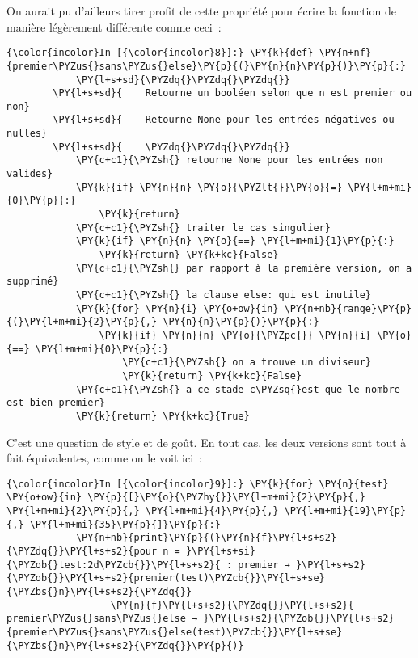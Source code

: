     On aurait pu d'ailleurs tirer profit de cette propriété pour écrire la
fonction de manière légèrement différente comme ceci~:

    \begin{Verbatim}[commandchars=\\\{\},frame=single,framerule=0.3mm,rulecolor=\color{cellframecolor}]
{\color{incolor}In [{\color{incolor}8}]:} \PY{k}{def} \PY{n+nf}{premier\PYZus{}sans\PYZus{}else}\PY{p}{(}\PY{n}{n}\PY{p}{)}\PY{p}{:}
            \PY{l+s+sd}{\PYZdq{}\PYZdq{}\PYZdq{}}
        \PY{l+s+sd}{    Retourne un booléen selon que n est premier ou non}
        \PY{l+s+sd}{    Retourne None pour les entrées négatives ou nulles}
        \PY{l+s+sd}{    \PYZdq{}\PYZdq{}\PYZdq{}}
            \PY{c+c1}{\PYZsh{} retourne None pour les entrées non valides}
            \PY{k}{if} \PY{n}{n} \PY{o}{\PYZlt{}}\PY{o}{=} \PY{l+m+mi}{0}\PY{p}{:}
                \PY{k}{return}
            \PY{c+c1}{\PYZsh{} traiter le cas singulier}
            \PY{k}{if} \PY{n}{n} \PY{o}{==} \PY{l+m+mi}{1}\PY{p}{:}
                \PY{k}{return} \PY{k+kc}{False}
            \PY{c+c1}{\PYZsh{} par rapport à la première version, on a supprimé}
            \PY{c+c1}{\PYZsh{} la clause else: qui est inutile}
            \PY{k}{for} \PY{n}{i} \PY{o+ow}{in} \PY{n+nb}{range}\PY{p}{(}\PY{l+m+mi}{2}\PY{p}{,} \PY{n}{n}\PY{p}{)}\PY{p}{:}
                \PY{k}{if} \PY{n}{n} \PY{o}{\PYZpc{}} \PY{n}{i} \PY{o}{==} \PY{l+m+mi}{0}\PY{p}{:}
                    \PY{c+c1}{\PYZsh{} on a trouve un diviseur}
                    \PY{k}{return} \PY{k+kc}{False}
            \PY{c+c1}{\PYZsh{} a ce stade c\PYZsq{}est que le nombre est bien premier}
            \PY{k}{return} \PY{k+kc}{True}
\end{Verbatim}


    C'est une question de style et de goût. En tout cas, les deux versions
sont tout à fait équivalentes, comme on le voit ici~:

    \begin{Verbatim}[commandchars=\\\{\},frame=single,framerule=0.3mm,rulecolor=\color{cellframecolor}]
{\color{incolor}In [{\color{incolor}9}]:} \PY{k}{for} \PY{n}{test} \PY{o+ow}{in} \PY{p}{[}\PY{o}{\PYZhy{}}\PY{l+m+mi}{2}\PY{p}{,} \PY{l+m+mi}{2}\PY{p}{,} \PY{l+m+mi}{4}\PY{p}{,} \PY{l+m+mi}{19}\PY{p}{,} \PY{l+m+mi}{35}\PY{p}{]}\PY{p}{:}
            \PY{n+nb}{print}\PY{p}{(}\PY{n}{f}\PY{l+s+s2}{\PYZdq{}}\PY{l+s+s2}{pour n = }\PY{l+s+si}{\PYZob{}test:2d\PYZcb{}}\PY{l+s+s2}{ : premier → }\PY{l+s+s2}{\PYZob{}}\PY{l+s+s2}{premier(test)\PYZcb{}}\PY{l+s+se}{\PYZbs{}n}\PY{l+s+s2}{\PYZdq{}}
                  \PY{n}{f}\PY{l+s+s2}{\PYZdq{}}\PY{l+s+s2}{    premier\PYZus{}sans\PYZus{}else → }\PY{l+s+s2}{\PYZob{}}\PY{l+s+s2}{premier\PYZus{}sans\PYZus{}else(test)\PYZcb{}}\PY{l+s+se}{\PYZbs{}n}\PY{l+s+s2}{\PYZdq{}}\PY{p}{)}
\end{Verbatim}


